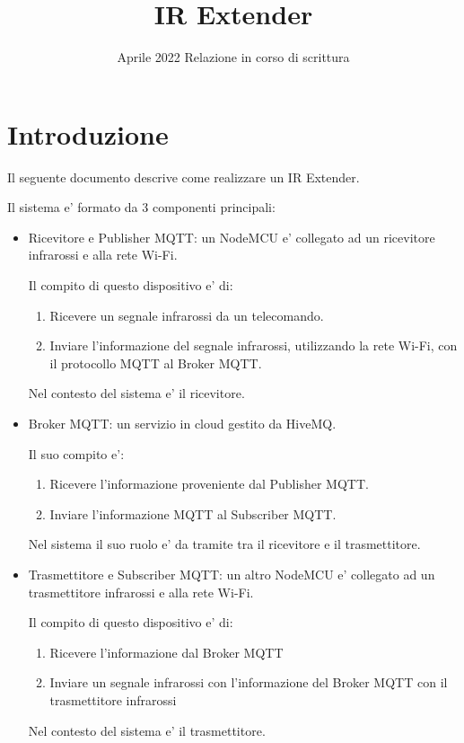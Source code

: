 \documentclass[a4paper]{article}
\title{IR Extender}
\date{
    Aprile 2022 \endgraf\bigskip
    \bigskip\bigskip\bigskip\bigskip\bigskip
    Relazione in corso di scrittura
}
\begin{document}
\begin{titlepage}
\maketitle    
\end{titlepage}

\tableofcontents
\clearpage

\section{Introduzione}

Il seguente documento descrive come realizzare un IR Extender.

Il sistema e' formato da 3 componenti principali:



\begin{itemize}
    \item Ricevitore e Publisher MQTT: un NodeMCU e' collegato ad un ricevitore infrarossi e alla rete Wi-Fi.

        Il compito di questo dispositivo e' di:
        \begin{enumerate}
            \item Ricevere un segnale infrarossi da un telecomando.
            \item Inviare l'informazione del segnale infrarossi, utilizzando la rete Wi-Fi, con il protocollo MQTT al Broker MQTT.
        \end{enumerate}

        Nel contesto del sistema e' il ricevitore.
    
    \item Broker MQTT: un servizio in cloud gestito da HiveMQ.
    
        Il suo compito e':
        \begin{enumerate}
            \item Ricevere l'informazione proveniente dal Publisher MQTT.
            \item Inviare l'informazione MQTT al Subscriber MQTT.
        \end{enumerate}

        Nel sistema il suo ruolo e' da tramite tra il ricevitore e il trasmettitore.
    
    \item Trasmettitore e Subscriber MQTT: un altro NodeMCU e' collegato ad un trasmettitore infrarossi e alla rete Wi-Fi.
    
        Il compito di questo dispositivo e' di:
        \begin{enumerate}
            \item Ricevere l'informazione dal Broker MQTT
            \item Inviare un segnale infrarossi con l'informazione del Broker MQTT con il trasmettitore infrarossi
        \end{enumerate}

        Nel contesto del sistema e' il trasmettitore.

\end{itemize}
\end{document}
